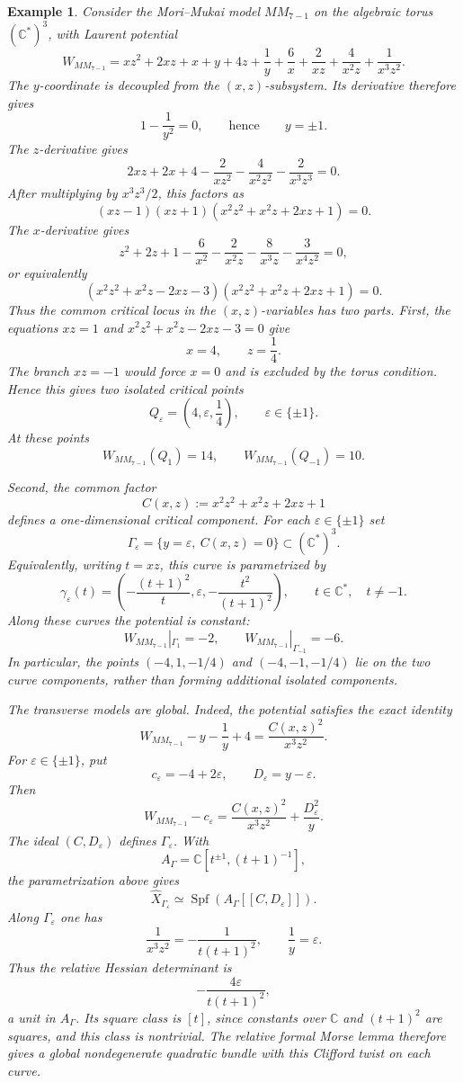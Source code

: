 \documentclass[11pt]{amsart}
\newtheorem{example}{Example}[section]
\begin{document}
\begin{example}
Consider the Mori--Mukai model $MM_{7-1}$ on the algebraic torus
$(\mathbb{C}^*)^3$, with Laurent potential
\[
W_{MM_{7-1}}=xz^2+2xz+x+y+4z+\frac{1}{y}
+\frac{6}{x}+\frac{2}{xz}+\frac{4}{x^2z}+\frac{1}{x^3z^2}.
\]
The $y$-coordinate is decoupled from the $(x,z)$-subsystem. Its derivative
therefore gives
\[
1-\frac{1}{y^2}=0,
\qquad\text{hence}\qquad
 y=\pm1.
\]
The $z$-derivative gives
\[
2xz+2x+4-\frac{2}{xz^2}-\frac{4}{x^2z^2}-\frac{2}{x^3z^3}=0.
\]
After multiplying by $x^3z^3/2$, this factors as
\[
(xz-1)(xz+1)(x^2z^2+x^2z+2xz+1)=0.
\]
The $x$-derivative gives
\[
z^2+2z+1-\frac{6}{x^2}-\frac{2}{x^2z}-\frac{8}{x^3z}
-\frac{3}{x^4z^2}=0,
\]
or equivalently
\[
(x^2z^2+x^2z-2xz-3)(x^2z^2+x^2z+2xz+1)=0.
\]
Thus the common critical locus in the $(x,z)$-variables has two parts.
First, the equations $xz=1$ and
$x^2z^2+x^2z-2xz-3=0$ give
\[
 x=4,
\qquad
 z=\frac{1}{4}.
\]
The branch $xz=-1$ would force $x=0$ and is excluded by the torus condition.
Hence this gives two isolated critical points
\[
Q_{\varepsilon}=\left(4,\varepsilon,\frac{1}{4}\right),
\qquad
\varepsilon\in\{\pm1\}.
\]
At these points
\[
W_{MM_{7-1}}(Q_1)=14,
\qquad
W_{MM_{7-1}}(Q_{-1})=10.
\]

Second, the common factor
\[
C(x,z):=x^2z^2+x^2z+2xz+1
\]
defines a one-dimensional critical component. For each
$\varepsilon\in\{\pm1\}$ set
\[
\Gamma_{\varepsilon}=\{y=\varepsilon,\ C(x,z)=0\}
\subset (\mathbb{C}^*)^3.
\]
Equivalently, writing $t=xz$, this curve is parametrized by
\[
\gamma_{\varepsilon}(t)=\left(
-\frac{(t+1)^2}{t},
\varepsilon,
-\frac{t^2}{(t+1)^2}
\right),
\qquad
 t\in\mathbb{C}^*,\quad t\neq -1.
\]
Along these curves the potential is constant:
\[
W_{MM_{7-1}}|_{\Gamma_1}=-2,
\qquad
W_{MM_{7-1}}|_{\Gamma_{-1}}=-6.
\]
In particular, the points $(-4,1,-1/4)$ and $(-4,-1,-1/4)$ lie on the two
curve components, rather than forming additional isolated components.

The transverse models are global. Indeed, the potential satisfies the exact
identity
\[
W_{MM_{7-1}}-y-\frac1y+4
=\frac{C(x,z)^2}{x^3z^2}.
\]
For $\varepsilon\in\{\pm1\}$, put
\[
c_{\varepsilon}=-4+2\varepsilon,
\qquad
D_{\varepsilon}=y-\varepsilon.
\]
Then
\[
W_{MM_{7-1}}-c_{\varepsilon}
=\frac{C(x,z)^2}{x^3z^2}+\frac{D_{\varepsilon}^2}{y}.
\]
The ideal $(C,D_{\varepsilon})$ defines $\Gamma_{\varepsilon}$. With
\[
A_{\Gamma}=\mathbb C[t^{\pm1},(t+1)^{-1}],
\]
the parametrization above gives
\[
\widehat X_{\Gamma_{\varepsilon}}
\simeq
\operatorname{Spf}\!\left(A_{\Gamma}[[C,D_{\varepsilon}]]\right).
\]
Along $\Gamma_{\varepsilon}$ one has
\[
\frac{1}{x^3z^2}=-\frac{1}{t(t+1)^2},
\qquad
\frac1y=\varepsilon.
\]
Thus the relative Hessian determinant is
\[
-\frac{4\varepsilon}{t(t+1)^2},
\]
a unit in $A_{\Gamma}$. Its square class is $[t]$, since constants over
$\mathbb C$ and $(t+1)^2$ are squares, and this class is nontrivial. The
relative formal Morse lemma therefore gives a global nondegenerate quadratic
bundle with this Clifford twist on each curve.


\end{example}
\end{document}
